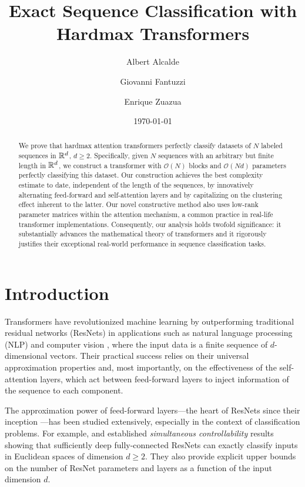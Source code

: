 \documentclass[11pt,a4paper]{amsart}
\title[{Exact Sequence Classification with Hardmax Transformers}]{Exact Sequence Classification with \\ Hardmax Transformers}
\author[A. Alcalde]{Albert Alcalde\thankssymb{2}}
\author[G. Fantuzzi]{Giovanni Fantuzzi\thankssymb{2}}
\author[E. Zuazua]{Enrique Zuazua\thankssymb{1}\thankssymb{2}\thankssymb{3}}
\begin{document}
\date{\today}
\begin{abstract}
    We prove that hardmax attention transformers perfectly classify datasets of $N$ labeled sequences in $\mathbb{R}^d$, $d\geq 2$. Specifically, given $N$ sequences with an arbitrary but finite length in $\mathbb{R}^d$, we construct a transformer with $\mathcal{O}(N)$ blocks and $\mathcal{O}(Nd)$ parameters perfectly classifying this dataset. Our construction achieves the best complexity estimate to date, independent of the length of the sequences, by innovatively alternating feed-forward and self-attention layers and by capitalizing on the clustering effect inherent to the latter. Our novel constructive method also uses low-rank parameter matrices within the attention mechanism, a common practice in real-life transformer implementations. Consequently, our analysis holds twofold significance: it substantially advances the mathematical theory of transformers and it rigorously justifies their exceptional real-world performance in sequence classification tasks.
\end{abstract}
\maketitle
%
\section{Introduction}\label{sec:introduction}
Transformers \cite{vaswaniAttentionAllYou2017} have revolutionized machine learning by outperforming traditional residual networks (ResNets) in applications such as natural language processing (NLP) \cite{openai2024gpt4technicalreport} and computer vision \cite{dosovitskiy2021imageworth16x16words}, where the input data is a finite sequence of $d$-dimensional vectors. Their practical success relies on their universal approximation properties \cite{yunAreTransformersUniversal2020, alberti2023sumformer} and, most importantly, on the effectiveness of the self-attention layers, which act between feed-forward layers to inject information of the sequence to each component.

The approximation power of feed-forward layers---the heart of ResNets since their inception \cite{kaimanHe_2016}---has been studied extensively, especially in the context of classification problems. For example, \citet{geshkovski2022turnpike} and \citet{domenec2023NODES} established \emph{simultaneous controllability} results showing that sufficiently deep fully-connected ResNets can exactly classify inputs in Euclidean spaces of dimension $d\geq 2$. They also provide explicit upper bounds on the number of ResNet parameters and layers as a function of the input dimension $d$. 
\end{document}
